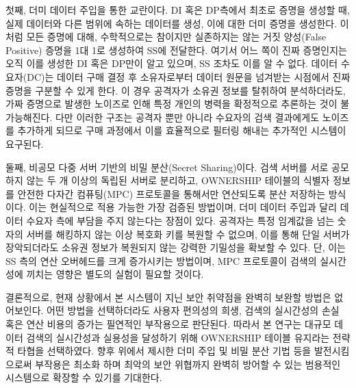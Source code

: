 \bigskip

첫째, 더미 데이터 주입을 통한 교란이다. DI 혹은 DP측에서 최초로 증명을 생성할 때, 실제 데이터와 다른 범위에 속하는 데이터를 생성, 이에 대한 더미 증명을 생성한다. 이처럼 모든 증명에 대해, 수학적으로는 참이지만 실존하지는 않는 거짓 양성(False Positive) 증명을 1대 1로 생성하여 SS에 전달한다. 여기서 어느 쪽이 진짜 증명인지는 오직 이를 생성한 DI 혹은 DP만이 알고 있으며, SS 조차도 이를 알 수 없다. 데이터 수요자(DC)는 데이터 구매 결정 후 소유자로부터 데이터 원문을 넘겨받는 시점에서 진짜 증명을 구분할 수 있게 한다. 이 경우 공격자가 소유권 정보를 탈취하여 분석하더라도, 가짜 증명으로 발생한 노이즈로 인해 특정 개인의 병력을 확정적으로 추론하는 것이 불가능해진다. 다만 이러한 구조는 공격자 뿐만 아니라 수요자의 검색 결과에게도 노이즈를 추가하게 되므로 구매 과정에서 이를 효율적으로 필터링 해내는 추가적인 시스템이 요구된다.

\bigskip

둘째, 비공모 다중 서버 기반의 비밀 분산(Secret Sharing)이다. 검색 서버를 서로 공모하지 않는 두 개 이상의 독립된 서버로 분리하고, OWNERSHIP 테이블의 식별자 정보를 안전한 다자간 컴퓨팅(MPC) 프로토콜을 통해서만 연산되도록 분산 저장하는 방식이다. 이는 현실적으로 적용 가능한 가장 검증된 방법이며, 더미 데이터 주입과 달리 데이터 수요자 측에 부담을 주지 않는다는 장점이 있다. 공격자는 특정 임계값을 넘는 숫자의 서버를 해킹하지 않는 이상 복호화 키를 복원할 수 없으며, 이를 통해 단일 서버가 장악되더라도 소유권 정보가 복원되지 않는 강력한 기밀성을 확보할 수 있다. 단, 이는 SS 측의 연산 오버헤드를 크게 증가시키는 방법이며, MPC 프로토콜이 검색의 실시간성에 끼치는 영향은 별도의 실험이 필요할 것이다.

\bigskip

결론적으로, 현재 상황에서 본 시스템이 지닌 보안 취약점을 완벽히 보완할 방법은 없어보인다. 어떤 방법을 선택하더라도 사용자 편의성의 희생, 검색의 실시간성의 손실 혹은 연산 비용의 증가는 필연적인 부작용으로 판단된다. 따라서 본 연구는 대규모 데이터 검색의 실시간성과 실용성을 달성하기 위해 OWNERSHIP 테이블 유지라는 전략적 타협을 선택하였다. 향후 위에서 제시한 더미 주입 및 비밀 분산 기법 등을 발전시킴으로써 부작용은 최소화 하며 최악의 보안 위협까지 완벽히 방어할 수 있는 범용적인 시스템으로 확장할 수 있기를 기대한다.